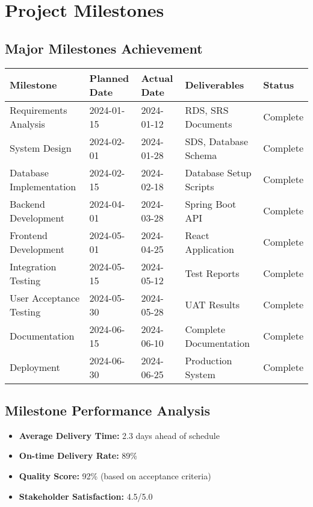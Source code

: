 \documentclass[12pt,a4paper]{article}
\begin{document}
\section{Project Milestones}

\subsection{Major Milestones Achievement}
\begin{longtable}{|p{3cm}|p{3cm}|p{3cm}|p{3cm}|p{2cm}|}
\hline
\rowcolor{lightgray}
\textbf{Milestone} & \textbf{Planned Date} & \textbf{Actual Date} & \textbf{Deliverables} & \textbf{Status} \\
\hline
Requirements Analysis & 2024-01-15 & 2024-01-12 & RDS, SRS Documents & \cellcolor{completedgreen}Complete \\
\hline
System Design & 2024-02-01 & 2024-01-28 & SDS, Database Schema & \cellcolor{completedgreen}Complete \\
\hline
Database Implementation & 2024-02-15 & 2024-02-18 & Database Setup Scripts & \cellcolor{completedgreen}Complete \\
\hline
Backend Development & 2024-04-01 & 2024-03-28 & Spring Boot API & \cellcolor{completedgreen}Complete \\
\hline
Frontend Development & 2024-05-01 & 2024-04-25 & React Application & \cellcolor{completedgreen}Complete \\
\hline
Integration Testing & 2024-05-15 & 2024-05-12 & Test Reports & \cellcolor{completedgreen}Complete \\
\hline
User Acceptance Testing & 2024-05-30 & 2024-05-28 & UAT Results & \cellcolor{completedgreen}Complete \\
\hline
Documentation & 2024-06-15 & 2024-06-10 & Complete Documentation & \cellcolor{completedgreen}Complete \\
\hline
Deployment & 2024-06-30 & 2024-06-25 & Production System & \cellcolor{completedgreen}Complete \\
\hline
\end{longtable}

\subsection{Milestone Performance Analysis}
\begin{itemize}
    \item \textbf{Average Delivery Time:} 2.3 days ahead of schedule
    \item \textbf{On-time Delivery Rate:} 89\%
    \item \textbf{Quality Score:} 92\% (based on acceptance criteria)
    \item \textbf{Stakeholder Satisfaction:} 4.5/5.0
\end{itemize}
\end{document}
